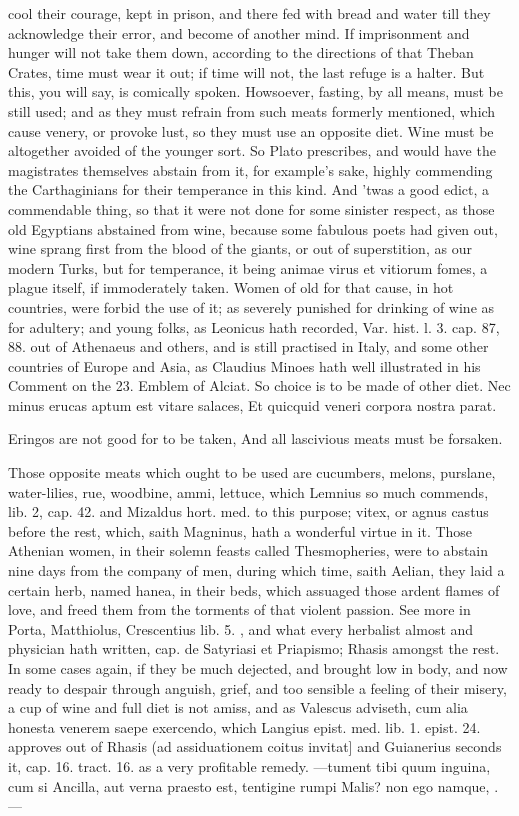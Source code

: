{cool their courage, kept in prison, and there fed with bread and water
till they acknowledge their error, and become of another mind. If
imprisonment and hunger will not take them down, according to the
directions of that  Theban Crates, time must wear it out; if time
will not, the last refuge is a halter. But this, you will say, is
comically spoken. Howsoever, fasting, by all means, must be still used;
and as they must refrain from such meats formerly mentioned, which
cause venery, or provoke lust, so they must use an opposite diet.
Wine must be altogether avoided of the younger sort. So
Plato prescribes, and would have the magistrates themselves
abstain from it, for example's sake, highly commending the
Carthaginians for their temperance in this kind. And 'twas a good
edict, a commendable thing, so that it were not done for some sinister
respect, as those old Egyptians abstained from wine, because some
fabulous poets had given out, wine sprang first from the blood of the
giants, or out of superstition, as our modern Turks, but for
temperance, it being animae virus et vitiorum fomes, a plague itself,
if immoderately taken. Women of old for that cause, in hot
countries, were forbid the use of it; as severely punished for drinking
of wine as for adultery; and young folks, as Leonicus hath recorded,
Var. hist. l. 3. cap. 87, 88. out of Athenaeus and others, and is still
practised in Italy, and some other countries of Europe and Asia, as
Claudius Minoes hath well illustrated in his Comment on the 23. Emblem
of Alciat. So choice is to be made of other diet.
Nec minus erucas aptum est vitare salaces,
Et quicquid veneri corpora nostra parat.

Eringos are not good for to be taken,
And all lascivious meats must be forsaken.

Those opposite meats which ought to be used are cucumbers, melons,
purslane, water-lilies, rue, woodbine, ammi, lettuce, which Lemnius so
much commends, lib. 2, cap. 42. and Mizaldus hort. med. to this
purpose; vitex, or agnus castus before the rest, which, saith
Magninus, hath a wonderful virtue in it. Those Athenian women, in
their solemn feasts called Thesmopheries, were to abstain nine days
from the company of men, during which time, saith Aelian, they laid a
certain herb, named hanea, in their beds, which assuaged those ardent
flames of love, and freed them from the torments of that violent
passion. See more in Porta, Matthiolus, Crescentius lib. 5. \etc{}, and
what every herbalist almost and physician hath written, cap. de
Satyriasi et Priapismo; Rhasis amongst the rest. In some cases again,
if they be much dejected, and brought low in body, and now ready to
despair through anguish, grief, and too sensible a feeling of their
misery, a cup of wine and full diet is not amiss, and as Valescus
adviseth, cum alia honesta venerem saepe exercendo, which Langius
epist. med. lib. 1. epist. 24. approves out of Rhasis (ad assiduationem
coitus invitat] and Guianerius seconds it, cap. 16. tract. 16. as a
 very profitable remedy.
---tument tibi quum inguina, cum si
Ancilla, aut verna praesto est, tentigine rumpi
Malis? non ego namque, \etc{}.---

}
